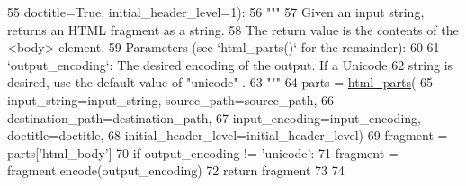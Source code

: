 \begin{DoxyCode}
55               doctitle=\textcolor{keyword}{True}, initial\_header\_level=1):
56     \textcolor{stringliteral}{"""}
57 \textcolor{stringliteral}{    Given an input string, returns an HTML fragment as a string.}
58 \textcolor{stringliteral}{    The return value is the contents of the <body> element.}
59 \textcolor{stringliteral}{    Parameters (see `html\_parts()` for the remainder):}
60 \textcolor{stringliteral}{}
61 \textcolor{stringliteral}{    - `output\_encoding`: The desired encoding of the output.  If a Unicode}
62 \textcolor{stringliteral}{      string is desired, use the default value of "unicode" .}
63 \textcolor{stringliteral}{    """}
64     parts = \hyperlink{namespacesoftware_1_1chipwhisperer_1_1common_1_1ui_1_1HelpWindow_a428e7cdcc49b6cdd98dc61d9218952e6}{html\_parts}(
65         input\_string=input\_string, source\_path=source\_path,
66         destination\_path=destination\_path,
67         input\_encoding=input\_encoding, doctitle=doctitle,
68         initial\_header\_level=initial\_header\_level)
69     fragment = parts[\textcolor{stringliteral}{'html\_body'}]
70     \textcolor{keywordflow}{if} output\_encoding != \textcolor{stringliteral}{'unicode'}:
71         fragment = fragment.encode(output\_encoding)
72     \textcolor{keywordflow}{return} fragment
73 
74 
\end{DoxyCode}
\hypertarget{namespacesoftware_1_1chipwhisperer_1_1common_1_1ui_1_1HelpWindow_a428e7cdcc49b6cdd98dc61d9218952e6}{}

